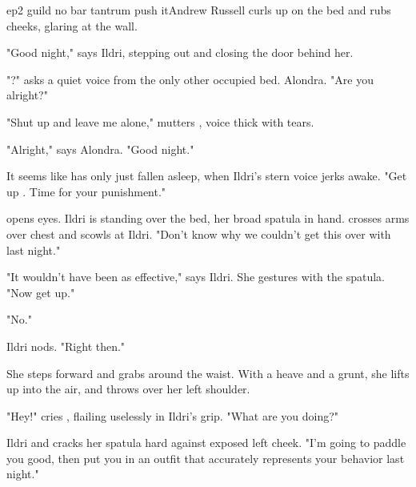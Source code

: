 \documentclass{book}
\begin{document}
\begin{childnode}{ep2 guild no bar tantrum push it}{Andrew Russell}
    \name{} curls up on the bed and rubs \hisher{} cheeks, glaring at the wall.

    "Good night," says Ildri, stepping out and closing the door behind her.

    "\nickname{}?" asks a quiet voice from the only other occupied bed. Alondra. "Are you alright?"

    "Shut up and leave me alone," mutters \name{}, \hisher{} voice thick with tears.

    "Alright," says Alondra. "Good night."

    It seems like \name{} has only just fallen asleep, when Ildri's stern voice jerks \himher{} awake. "Get up \name{}. Time for your punishment."
            
    \name{} opens \hisher{} eyes. Ildri is standing over the bed, her broad spatula in hand. \name{} crosses \hisher{} arms over \hisher{} chest and scowls at Ildri. 
    "Don't know why we couldn't get this over with last night."

    "It wouldn't have been as effective," says Ildri. She gestures with the spatula. "Now get up."

    "No."

    Ildri nods. "Right then."

    She steps forward and grabs \name{} around the waist. With a heave and a grunt, she lifts \name{} up into the air, and throws \himher{} over her left shoulder.

    "Hey!" cries \name{}, flailing uselessly in Ildri's grip. "What are you doing?"

    Ildri  and cracks her spatula 
    hard against \names{} exposed left cheek. "I'm going to paddle you good, then put you in an
    outfit that accurately represents your behavior last night."



\end{childnode}
\end{document}
